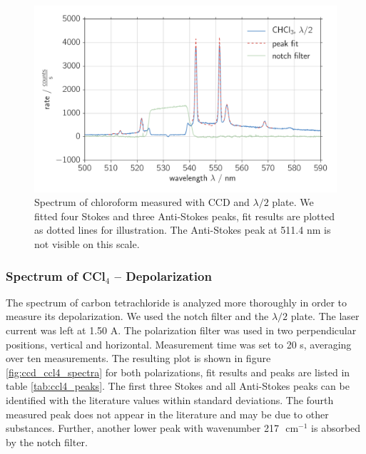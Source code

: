 \begin{figure}[htpb]
    \centering
    \includegraphics[width=0.8\linewidth]{analysis/figures/ccd_chcl3_spectra}
    \caption{
        Spectrum of chloroform measured with CCD and $\lambda / 2$ plate. We fitted four Stokes and 
        three Anti-Stokes peaks, fit results are plotted as dotted lines for illustration. The Anti-Stokes 
        peak at 511.4 nm is not visible on this scale. 
    }
    \label{fig:ccd_chcl3_spectra}
\end{figure}

\subsubsection{Spectrum of CCl$_4$ -- Depolarization}
The spectrum of carbon tetrachloride is analyzed more thoroughly in order to measure its depolarization. We used 
the notch filter and the $\lambda / 2$ plate. The laser current was left at 1.50 A. The polarization filter was 
used in two perpendicular positions, vertical and horizontal. Measurement time was set to 20 s, averaging over 
ten measurements. The resulting plot is shown in figure \ref{fig:ccd_ccl4_spectra} for both polarizations, fit results 
and peaks are listed in table \ref{tab:ccl4_peaks}. The first three Stokes and all Anti-Stokes peaks can be 
identified with the literature values within standard deviations. The fourth measured peak does not appear 
in the literature and may be due to other substances. Further, another lower peak with wavenumber 217
$\text{ cm}^{-1}$ is absorbed by the notch filter.

